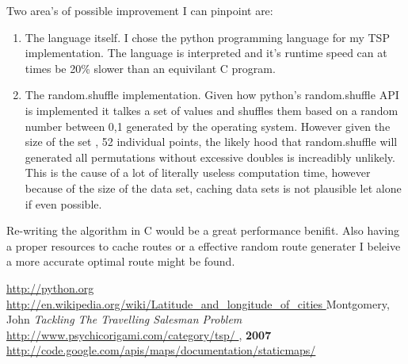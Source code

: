 \documentclass[12pt]{article}
\begin{document}
Two area's of possible improvement I can pinpoint are:
\begin{enumerate}
\item The language itself. I chose the python programming language for my TSP implementation.
The language is interpreted and it's runtime speed can at times be 20\% slower than an equivilant C program.
\item The random.shuffle implementation. Given how python's random.shuffle API is implemented it talkes a set
of values and shuffles them based on a random number between 0,1 generated by the operating system. However given the size of the set
, 52 individual points, the likely hood that random.shuffle will generated all permutations without excessive doubles is increadibly unlikely.
This is the cause of a lot of literally useless computation time, however because of the size of the data set, caching data sets is not plausible let alone if even possible.
\end{enumerate}

Re-writing the algorithm in C would be a great performance benifit. Also having a proper resources to cache routes or a effective random route generater I beleive a more accurate optimal route might be found.

\begin{thebibliography}{99}
 {\href{ http://python.org }{ http://python.org }}
 {\href{ http://en.wikipedia.org/wiki/Latitude_and_longitude_of_cities }{ http://en.wikipedia.org/wiki/Latitude\_and\_longitude\_of\_cities }}
 Montgomery, John {\it Tackling The Travelling Salesman Problem }{\href{ http://www.psychicorigami.com/category/tsp/ }{ http://www.psychicorigami.com/category/tsp/ } }, {\bf 2007}
 {\href{ http://code.google.com/apis/maps/documentation/staticmaps/  }{ http://code.google.com/apis/maps/documentation/staticmaps/ }}

\end{thebibliography}
\end{document}
